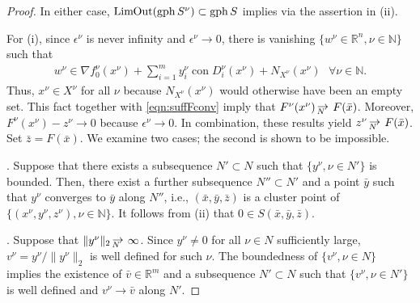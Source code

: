 \documentclass[smallextended,envcountsect]{svjour3}
\newcommand{\nats}{\mathbb{N}}
\newcommand{\reals}{\mathbb{R}}
\newcommand{\nOutLim}{\mathop{\rm Lim\hspace{-0.01cm}Out}\nolimits}
\DeclareMathOperator{\con}{con}
\DeclareMathOperator{\gph}{gph}
\def\Nto{\,{\raise 1pt\hbox{$\rightarrow$}}\kern -12pt
     \hbox{\lower 3pt \hbox{$\, \scriptstyle N$}}\hskip7pt}
\begin{document}
\begin{proof}
In either case, $\nOutLim (\gph S^\nu) \subset \gph S$ implies via \cite[Convergence statement 7.31]{Royset_Wets_2021} the assertion in (ii). 

\medskip

For (i), since $\epsilon^\nu$ is never infinity and $\epsilon^\nu\to 0$, there is vanishing $\{w^\nu\in\reals^n, \nu\in\nats\}$ such that 
\begin{align}\label{eqn:winclusion}
w^\nu \in \nabla f_0^\nu(x^\nu) + \sum_{i=1}^m y_i^\nu \con D_i^\nu(x^\nu) + N_{X^\nu}(x^\nu)~~~\forall \nu\in\nats.
\end{align}
Thus, $x^\nu\in X^\nu$ for all $\nu$ because $N_{X^\nu}(x^\nu)$ would otherwise have been an empty set. This fact together with \eqref{eqn:suffFconv} imply that $F^\nu(x^\nu)\Nto F(\bar x)$. Moreover, $F^\nu(x^\nu) - z^\nu\to 0$  because $\epsilon^\nu \to 0$. In combination, these results yield $z^\nu \Nto F(\bar x)$. Set $\bar z = F(\bar x)$. We examine two cases; the second is shown to be impossible.

\medskip

. Suppose that there exists a subsequence $N' \subset N$ such that $\{y^\nu, \nu\in N'\}$ is bounded. Then, there exist a further subsequence $N''\subset N'$ and a point $\bar y$ such that $y^\nu$ converges to $\bar y$ along $N''$, i.e., $(\bar x, \bar y, \bar z)$ is a cluster point of $\{(x^\nu,y^\nu,z^\nu), \nu\in \nats\}$. It follows from (ii) that $0 \in S(\bar x, \bar y, \bar z)$.

\medskip
  
. Suppose that $\|y^\nu\|_2 \Nto \infty$. Since $y^\nu \neq 0$ for all $\nu \in N$ sufficiently large, $v^\nu = y^\nu/\|y^\nu\|_2$ is well defined for such $\nu$. The boundedness of $\{v^\nu, \nu\in N\}$ implies the existence of $\bar v \in \reals^m$ and a subsequence $N'\subset N$ such that $\{v^\nu, \nu\in N'\}$ is well defined and $v^\nu \to \bar v$ along $N'$.  


\end{proof}
\end{document}
